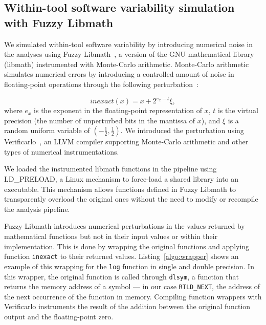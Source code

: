 \documentclass[11pt,onecolumn]{article}
\begin{document}
\subsection{Within-tool software variability simulation with Fuzzy Libmath}

We simulated within-tool software variability by introducing 
numerical noise in the analyses using
Fuzzy Libmath~\cite{salari2021accurate}, a version of the GNU
mathematical library (libmath) instrumented with Monte-Carlo arithmetic.
Monte-Carlo arithmetic simulates numerical errors
by introducing a controlled amount of noise in floating-point
operations through the following perturbation~\cite{Parker1997-qq}:

\begin{equation} \label{eq:mca_inexact}
  inexact(x) = x + 2^{e_x-t}\xi,
\end{equation}
where $e_x$ is the exponent in the floating-point representation of $x$,
$t$ is the virtual precision (the number of unperturbed bits in the
mantissa of $x$), and $\xi$ is a random uniform variable of
$(-\frac{1}{2}, \frac{1}{2})$. We introduced the perturbation using
Verificarlo~\cite{denis2015verificarlo}, an LLVM compiler supporting Monte-Carlo
arithmetic and other types of numerical instrumentations.

We loaded the instrumented libmath functions in the pipeline using
LD\_PRELOAD, a Linux mechanism to force-load a shared library into an
executable. This mechanism allows functions defined in Fuzzy Libmath to transparently
overload the original ones without the need to modify or recompile the
analysis pipeline.

Fuzzy Libmath introduces numerical perturbations in the values returned by
mathematical functions but not in their input values or within their
implementation. This is done by wrapping the original functions and
applying function \texttt{inexact} to their returned values.
Listing~\ref{algo:wrapper} shows an example of this wrapping for the
\texttt{log} function in single and double precision. In this wrapper, the
original function is called through \texttt{dlsym}, a function that returns
the memory address of a symbol --- in our case \texttt{RTLD\_NEXT}, the
address of the next occurrence of the function in memory. Compiling function wrappers
with Verificarlo instruments the result of the
addition between the original function output and the floating-point zero.


\end{document}

